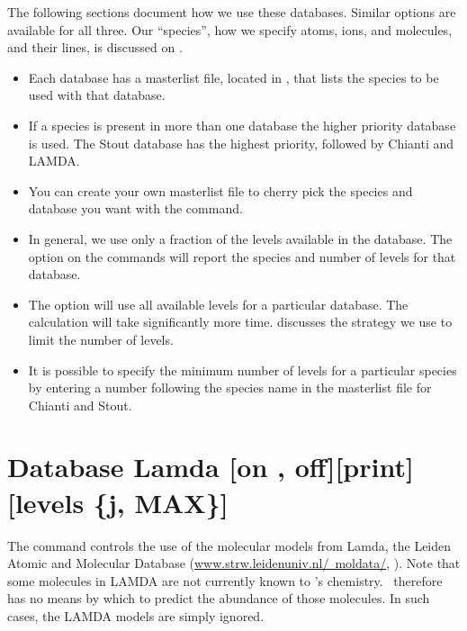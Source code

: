 The following sections document how we use these databases.
Similar options are available for all three.
Our ``species'', how we specify atoms, ions, and molecules,
and their lines, is discussed on \pageref{sec:SpeciesDefine}.

\begin{itemize}
  
  \item Each database has a masterlist file, located in 
  , that lists the species
  to be used with that database.  

  \item If a species is
  present in more than one database the higher priority database is used.
  The Stout database has the highest priority, followed by Chianti and LAMDA.  
  
  \item You can create your own masterlist file
  to cherry pick the species and database you want with the
   command.
  
  \item In general, we use only a fraction of the levels available in the
  database.  The  option on the commands
  will report the species and number of levels for that database.
  
  \item The  option will use all available levels
  for a particular database.
  The calculation will take significantly more time.
  \citet{2013MNRAS.429.3133L} discusses
  the strategy we use to limit the number of levels.
  
  \item It is possible to specify the minimum number of levels 
  for a particular species by entering
  a number following the species name in the masterlist file for Chianti and Stout.
  
\end{itemize}

\section{Database Lamda [on , off][print][levels \{j, MAX\}]}
\label{sec:SetLamda}
The command controls the use of the molecular models from Lamda, the Leiden Atomic and Molecular
Database (\href{http://www.strw.leidenuniv.nl/~moldata/}{www.strw.leidenuniv.nl/~moldata/}, 
\citet{Schoier.F05An-atomic-and-molecular-database-for-analysis}).   
Note that some molecules in LAMDA are not
currently known to \Cloudy 's chemistry.  \Cloudy\ therefore has no means by
which to predict the abundance of those molecules.  In such cases, the
LAMDA models are simply ignored. 

